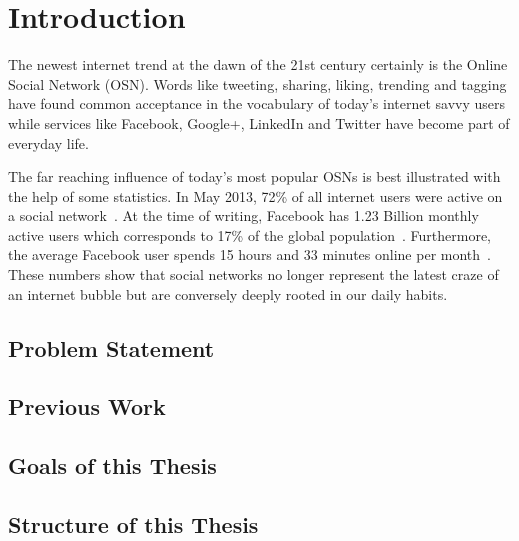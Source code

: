 \chapter{Introduction}
\label{cha:intro}
The newest internet trend at the dawn of the 21st century certainly is the Online Social Network (OSN). Words like tweeting, sharing, liking, trending and tagging have found common acceptance in the vocabulary of today's internet savvy users while services like Facebook, Google+, LinkedIn and Twitter have become part of everyday life. 

The far reaching influence of today's most popular OSNs is best illustrated with the help of some statistics. In May 2013, 72\% of all internet users were active on a social network~\cite{site:Jones13}. At the time of writing, Facebook has 1.23 Billion monthly active users which corresponds to 17\% of the global population~\cite{site:Bullas14,site:worldometers}. Furthermore, the average Facebook user spends 15 hours and 33 minutes online per month~\cite{site:StatisticBrain}. These numbers show that social networks no longer represent the latest craze of an internet bubble but are conversely deeply rooted in our daily habits.



\section{Problem Statement}

\section{Previous Work}

\section{Goals of this Thesis}

\section{Structure of this Thesis}

